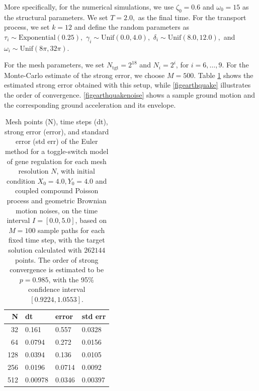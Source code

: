 \documentclass[reqno,12pt]{amsart}
\theoremstyle{plain} %
\theoremstyle{definition} %
\begin{document}
More specifically, for the numerical simulations, we use $\zeta_0 = 0.6$ and $\omega_0 = 15$ as the structural parameters. We set $T = 2.0,$ as the final time. For the transport process, we set $k=12$ and define the random parameters as $\tau_i \sim \textrm{Exponential}(0.25),$ $\gamma_i \sim \textrm{Unif}(0.0, 4.0),$ $\delta_i \sim \textrm{Unif}(8.0, 12.0),$ and $\omega_i \sim \textrm{Unif}(8\pi, 32\pi).$

For the mesh parameters, we set $N_{\textrm{tgt}} = 2^{18}$ and $N_i = 2^i$, for $i=6, \ldots, 9$. For the Monte-Carlo estimate of the strong error, we choose $M = 500.$ Table \ref{tableearthquake} shows the estimated strong error obtained with this setup, while \cref{figearthquake} illustrates the order of convergence. \cref{figearthquakenoise} shows a sample ground motion and the corresponding ground acceleration and its envelope.

\begin{table}
    \begin{tabular}[htb]{|r|l|l|l|}
        \hline N & dt & error & std err \\
        \hline \hline
        32 & 0.161 & 0.557 & 0.0328 \\
        64 & 0.0794 & 0.272 & 0.0156 \\
        128 & 0.0394 & 0.136 & 0.0105 \\
        256 & 0.0196 & 0.0714 & 0.0092 \\
        512 & 0.00978 & 0.0346 & 0.00397 \\
        \hline
    \end{tabular}
    \bigskip

    \caption{Mesh points (N), time steps (dt), strong error (error), and standard error (std err) of the Euler method for a toggle-switch model of gene regulation for each mesh resolution $N$, with initial condition $X_0 = 4.0, Y_0 = 4.0$ and coupled compound Poisson process and geometric Brownian motion noises, on the time interval $I = [0.0, 5.0]$, based on $M = 100$ sample paths for each fixed time step, with the target solution calculated with $262144$ points. The order of strong convergence is estimated to be $p = 0.985$, with the 95\% confidence interval $[0.9224, 1.0553]$.}
    \label{tableearthquake}
\end{table}
\end{document}
